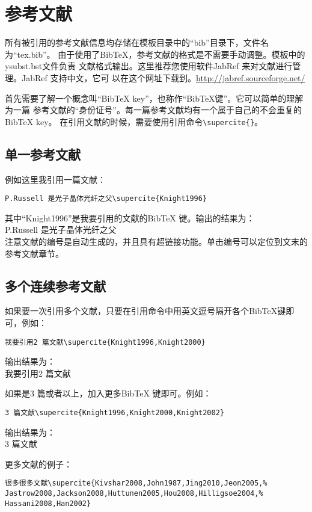 \chapter{参考文献}
\label{chap:bib}

所有被引用的参考文献信息均存储在模板目录中的“bib”目录下，文件名为“tex.bib”。
由于使用了BibTeX，参考文献的格式是不需要手动调整。模板中的ysubst.bst文件负责
文献格式输出。这里推荐您使用软件JabRef 来对文献进行管理。JabRef 支持中文，它可
以在这个网址下载到。\url{http://jabref.sourceforge.net/}

首先需要了解一个概念叫“BibTeX key”，也称作“BibTeX键”。它可以简单的理解为一篇
参考文献的“身份证号”。每一篇参考文献均有一个属于自己的不会重复的BibTeX key。
在引用文献的时候，需要使用引用命令\verb|\supercite{}|。

\section{单一参考文献}
例如这里我引用一篇文献：
\begin{verbatim}
P.Russell 是光子晶体光纤之父\supercite{Knight1996}
\end{verbatim}
其中“Knight1996”是我要引用的文献的BibTeX 键。输出的结果为：\\[5pt]
 P.Russell 是光子晶体光纤之父\supercite{Knight1996}\\[5pt]
 注意文献的编号是自动生成的，并且具有超链接功能。单击编号可以定位到文末的参考文献章节。

\section{多个连续参考文献}
 如果要一次引用多个文献，只要在引用命令中用英文逗号隔开各个BibTeX键即可，例如：
 \begin{verbatim}
我要引用2 篇文献\supercite{Knight1996,Knight2000}
\end{verbatim}
输出结果为： \\[5pt]
我要引用2 篇文献\supercite{Knight1996,Knight2000}


如果是3 篇或者以上，加入更多BibTeX 键即可。例如：
 \begin{verbatim}
3 篇文献\supercite{Knight1996,Knight2000,Knight2002}
\end{verbatim}
输出结果为： \\[5pt]
3 篇文献\supercite{Knight1996,Knight2000,Knight2002}

更多文献的例子：
 \begin{verbatim}
很多很多文献\supercite{Kivshar2008,John1987,Jing2010,Jeon2005,%
Jastrow2008,Jackson2008,Huttunen2005,Hou2008,Hilligsoe2004,%
Hassani2008,Han2002}
\end{verbatim}

